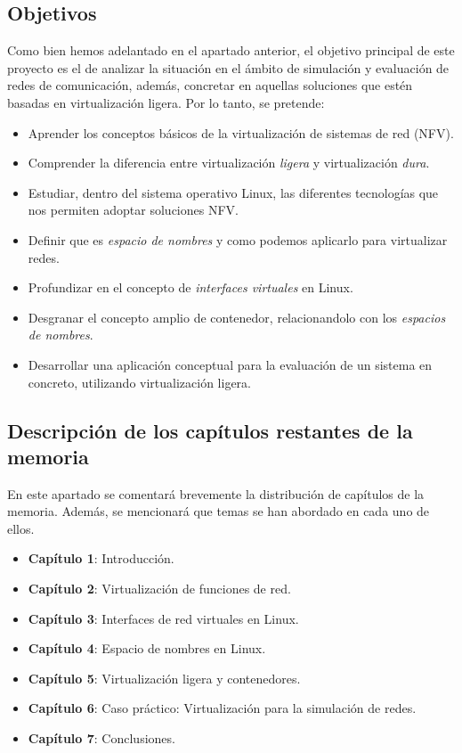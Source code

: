 \documentclass[12pt]{article}
\begin{document}
	\pagebreak
	
	\subsection{Objetivos}
	\noindent Como bien hemos adelantado en el apartado anterior, el objetivo principal de este proyecto es el de analizar la situación en el ámbito de simulación y evaluación de redes de comunicación, además, concretar en aquellas soluciones que estén basadas en virtualización ligera. Por lo tanto, se pretende: 
	\begin{itemize}
		\item Aprender los conceptos básicos de la virtualización de sistemas de red (NFV).
		\item Comprender la diferencia entre virtualización \textit{ligera} y virtualización \textit{dura}.
		\item Estudiar, dentro del sistema operativo Linux, las diferentes tecnologías que nos permiten adoptar soluciones NFV.
		\item Definir que es \textit{espacio de nombres} y como podemos aplicarlo para virtualizar redes.
		\item Profundizar en el concepto de \textit{interfaces virtuales} en Linux.
		\item Desgranar el concepto amplio de contenedor, relacionandolo con los \textit{espacios de nombres}.
		\item Desarrollar una aplicación conceptual para la evaluación de un sistema en concreto, utilizando virtualización ligera.
	\end{itemize}

	\subsection{Descripción de los capítulos restantes de la memoria}
	\noindent En este apartado se comentará brevemente la distribución de capítulos de la memoria. Además, se mencionará que temas se han abordado en cada uno de ellos.
	\begin{itemize}
		\item \textbf{Capítulo 1}: Introducción.
		\item \textbf{Capítulo 2}: Virtualización de funciones de red.
		\item \textbf{Capítulo 3}: Interfaces de red virtuales en Linux.
		\item \textbf{Capítulo 4}: Espacio de nombres en Linux.
		\item \textbf{Capítulo 5}: Virtualización ligera y contenedores.
		\item \textbf{Capítulo 6}: Caso práctico: Virtualización para la simulación de redes.
		\item \textbf{Capítulo 7}: Conclusiones.
	\end{itemize}
	
\end{document}
